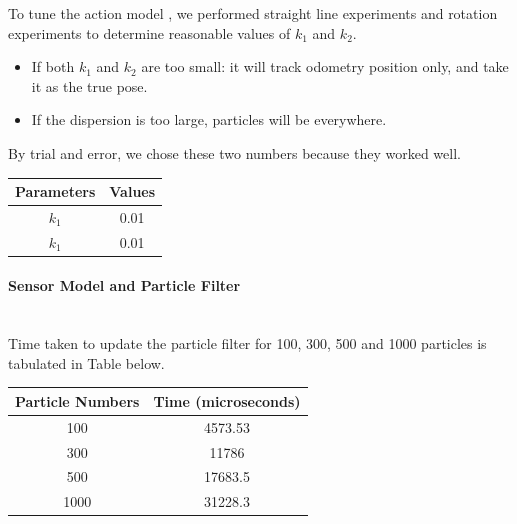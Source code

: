 \documentclass[journal]{IEEEtran}
\begin{document}
To tune the action model \cite{pbr}, we performed straight line experiments and rotation experiments to determine reasonable values of $k_1$ and $k_2$.
\begin{itemize}
  \item If both $k_1$ and $k_2$ are too small: it will track odometry position only, and take it as the true pose.
  \item If the dispersion is too large, particles will be everywhere.
\end{itemize}
By trial and error, we chose these two numbers because they worked well.

\begin{center}
\begin{tabular}{ |c|c| } 
 \hline
 \textbf{Parameters} & \textbf{Values} \\ 
 \hline
 $k_1$ & 0.01 \\ 
 \hline
 $k_1$ & 0.01 \\ 
 \hline
\end{tabular}
\end{center} 


\paragraph{Sensor Model and Particle Filter}  \hfill\\

Time taken to update the particle filter for 100, 300, 500 and 1000 particles is tabulated in Table below.
\begin{center}
\begin{tabular}{ |c|c| } 
 \hline
 \textbf{Particle Numbers} & \textbf{Time (microseconds)} \\ 
 \hline
 100 & 4573.53 \\ 
 \hline
 300 & 11786 \\ 
 \hline
 500 & 17683.5 \\ 
 \hline
 1000 & 31228.3 \\ 
 \hline
\end{tabular}
\end{center} 
\end{document}
